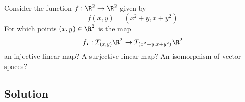 \documentclass[12pt]{quiz}
\begin{document}
\maketitle

\noindent
Consider the function $f:\R^2 \to \R^2$ given by
$$
f(x,y) = (x^2 + y,x + y^2)
$$
For which points $(x,y) \in \R^2$ is the map
$$
f_\star : T_{(x,y)} \R^2 \to T_{(x^2 + y,x + y^2)} \R^2
$$
an injective linear map?  A surjective linear map?  An isomorphism of
vector spaces?

\subsection*{Solution}

\pagebreak
\null
\end{document}
